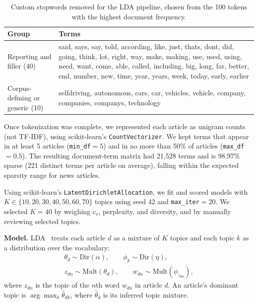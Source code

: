 \documentclass[conference]{IEEEtran}
\begin{document}
\begin{table}[H]
\caption{Custom stopwords removed for the LDA pipeline, chosen from the 100 tokens with the highest document frequency.}
\label{tab:stopwords}
\centering
\footnotesize
\begin{tabular}{@{}p{}p{}@{}}
\toprule
\textbf{Group} & \textbf{Terms} \\
\midrule
Reporting and filler (40) & said, says, say, told, according, like, just, thats, dont, did, going, think, lot, right, way, make, making, use, used, using, need, want, come, able, called, including, big, long, far, better, end, number, new, time, year, years, week, today, early, earlier \\
\addlinespace
Corpus-defining or generic (10) & selfdriving, autonomous, cars, car, vehicles, vehicle, company, companies, companys, technology \\
\bottomrule
\end{tabular}
\end{table}

Once tokenization was complete, we represented each article as unigram counts (not TF-IDF), using scikit-learn's \texttt{CountVectorizer}. We kept terms that appear in at least 5 articles (\texttt{min\_df}$=5$) and in no more than 50\% of articles (\texttt{max\_df}$=0.5$). The resulting document-term matrix had 21,528 terms and is 98.97\% sparse (221 distinct terms per article on average), falling within the expected sparsity range for news articles.

Using scikit-learn's \texttt{LatentDirichletAllocation}, we fit and scored models with $K\in\{10,20,30,40,50,60,70\}$ topics using seed 42 and \texttt{max\_iter}$=20$. We selected $K=40$ by weighing $c_v$, perplexity, and diversity, and by manually reviewing selected topics.

\textbf{Model.} LDA~\cite{blei2003lda} treats each article $d$ as a mixture of $K$ topics and each topic $k$ as a distribution over the vocabulary:
\begin{equation}
\begin{gathered}
\theta_d \sim \mathrm{Dir}(\alpha), \qquad \phi_k \sim \mathrm{Dir}(\eta),\\
z_{dn} \sim \mathrm{Mult}(\theta_d), \qquad w_{dn} \sim \mathrm{Mult}(\phi_{z_{dn}}),
\end{gathered}
\label{eq:lda}
\end{equation}
where $z_{dn}$ is the topic of the $n$th word $w_{dn}$ in article $d$. An article's dominant topic is $\arg\max_k \hat{\theta}_{dk}$, where $\hat{\theta}_d$ is its inferred topic mixture.
\end{document}
